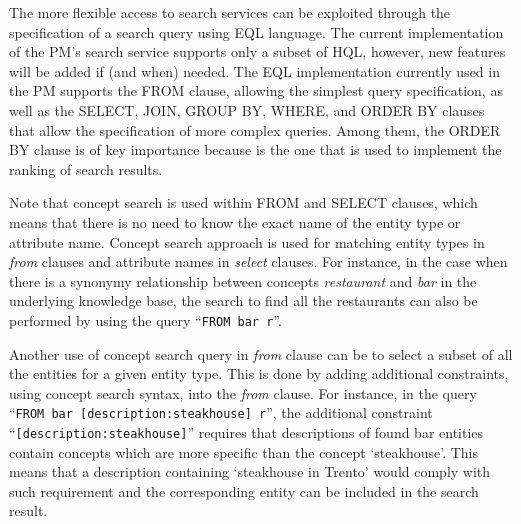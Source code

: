 The more flexible access to search services can be exploited through the specification of a search query using EQL language. The current implementation of the PM's search service supports only a subset of HQL, however, new features will be added if (and when) needed. The EQL implementation currently used in the PM supports the FROM clause, allowing the simplest query specification, as well as the SELECT, JOIN, GROUP BY, WHERE, and ORDER BY clauses that allow the specification of more complex queries. Among them, the ORDER BY clause is of key importance because is the one that is used to implement the ranking of search results. 

Note that concept search is used within FROM and SELECT clauses, which means that there is no need to know the exact name of the entity type or attribute name. Concept search approach is used for matching entity types in \emph{from} clauses and attribute names in \emph{select} clauses. 
 For instance, in the case when there is a synonymy relationship between concepts \emph{restaurant} and \emph{bar} in the underlying knowledge base, the search to find all the restaurants can also be performed by using the query ``\texttt{FROM bar r}''.

Another use of concept search query in \emph{from} clause can be to select a subset of all the entities for a given entity type. 
This is done by adding additional constraints, using concept search syntax, into the \emph{from} clause.
For instance, in the query ``\texttt{FROM bar [description:steakhouse] r}'', the additional constraint ``\texttt{[description:steakhouse]}'' requires that descriptions of found bar entities contain concepts which are more specific than the concept `steakhouse'. This means that a description containing `steakhouse in Trento' would comply with such requirement and the corresponding entity can be included in the search result. 



